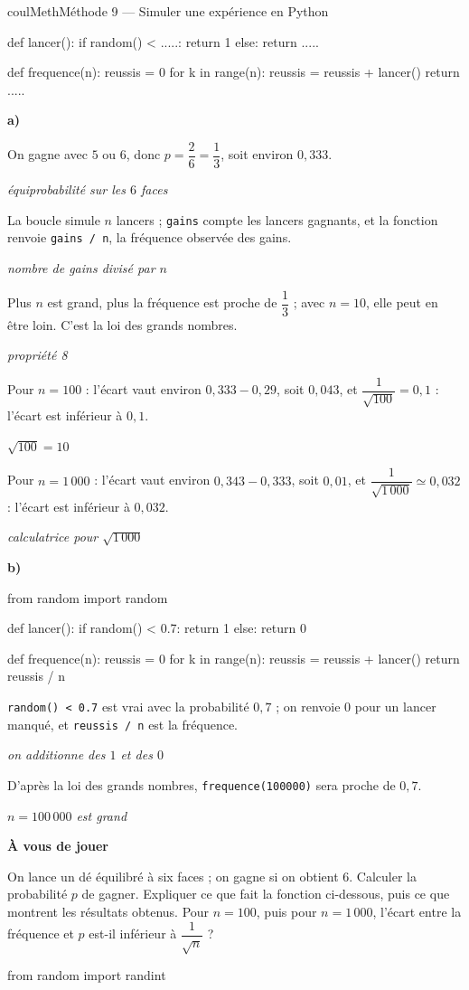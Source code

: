 \documentclass[11pt,a4paper]{article}
\makeatletter
\renewcommand{\approx}{\simeq}
\newcounter{lycee@signet}
\newcommand{\signet}[3][]{\stepcounter{lycee@signet}%
  \edef\lycee@dest{\if\relax\detokenize{#1}\relax
    signet.\arabic{lycee@signet}\else#1\fi}%
  \hypertarget{\lycee@dest}{}\bookmark[level=#2,dest=\lycee@dest]{#3}}
\newcommand{\res}[1]{#1}
\newcounter{methode}
\newenvironment{methodebox}[1][Méthode]{\stepcounter{methode}%
  \begin{boitecours}[phantom={\signet[methode-\arabic{methode}]{2}{#1}}]{coulMeth}{#1}}%
  {\end{boitecours}}
\newcommand{\etape}[1]{\par\smallskip\textbf{\color{coulMeth}#1}\par\nobreak\smallskip}
\newcommand{\explique}[2]{\par\smallskip\noindent
  \begin{minipage}[t]{0.57\linewidth}\raggedright #1\end{minipage}\hfill
  \begin{minipage}[t]{0.40\linewidth}\raggedright\leavevmode
    {\small\itshape\color{black!60}#2}\end{minipage}\par}
\newcommand{\cas}[1]{\par\smallskip\noindent\textbf{\color{coulExo}#1}\vadjust{\nobreak}}
\newenvironment{correction}{\par}{\par}
\makeatother
\begin{document}
\begin{methodebox}[Méthode 9 --- Simuler une expérience en Python]
\begin{python}
def lancer():
    if random() < .....:
        return 1
    else:
        return .....

def frequence(n):
    reussis = 0
    for k in range(n):
        reussis = reussis + lancer()
    return .....
\end{python}
\begin{correction}
\cas{a)}
\explique{On gagne avec $5$ ou $6$, donc $p=\dfrac{2}{6}=\res{\dfrac{1}{3}}$, soit environ
$0{,}333$.}{équiprobabilité sur les $6$ faces}
\explique{La boucle simule $n$ lancers ; \texttt{gains} compte les lancers gagnants,
et la fonction renvoie \res{\texttt{gains / n}, la fréquence observée des gains}.}{nombre
de gains divisé par $n$}
\explique{Plus $n$ est grand, plus la fréquence est proche de $\dfrac{1}{3}$ ; avec
$n=10$, elle peut en être loin. C'est \res{la loi des grands nombres}.}{propriété 8}
\explique{Pour $n=100$ : l'écart vaut environ $0{,}333-0{,}29$, soit $0{,}043$, et
$\dfrac{1}{\sqrt{100}}=0{,}1$ : \res{l'écart est inférieur à $0{,}1$}.}{$\sqrt{100}=10$}
\explique{Pour $n=1\,000$ : l'écart vaut environ $0{,}343-0{,}333$, soit $0{,}01$, et
$\dfrac{1}{\sqrt{1\,000}}\approx 0{,}032$ : \res{l'écart est inférieur à
$0{,}032$}.}{calculatrice pour $\sqrt{1\,000}$}
\cas{b)}
\begin{python}
from random import random

def lancer():
    if random() < 0.7:
        return 1
    else:
        return 0

def frequence(n):
    reussis = 0
    for k in range(n):
        reussis = reussis + lancer()
    return reussis / n
\end{python}
\explique{\texttt{random() < 0.7} est vrai avec la probabilité $0{,}7$ ; on renvoie $0$
pour un lancer manqué, et \texttt{reussis / n} est la fréquence.}{on additionne des $1$
et des $0$}
\explique{D'après la loi des grands nombres, \texttt{frequence(100000)} sera proche de
\res{$0{,}7$}.}{$n=100\,000$ est grand}
\end{correction}

\etape{À vous de jouer}
\begin{questions}[label=\alph*)]
  \item On lance un dé équilibré à six faces ; on gagne si on obtient $6$. Calculer la
    probabilité $p$ de gagner. Expliquer ce que fait la fonction ci-dessous, puis ce
    que montrent les résultats obtenus. Pour $n=100$, puis pour $n=1\,000$, l'écart
    entre la fréquence et $p$ est-il inférieur à $\dfrac{1}{\sqrt{n}}$ ?
\end{questions}
\begin{python}
from random import randint


\end{python}
\end{methodebox}
\end{document}
